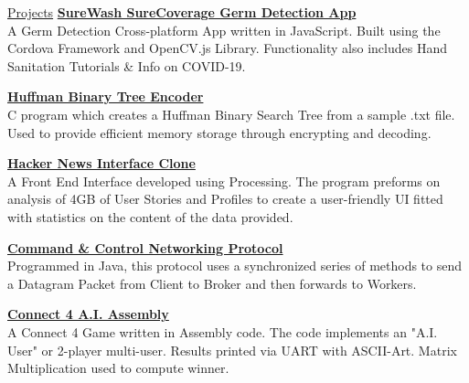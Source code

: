 \documentclass{resume} %
\begin{document}
\begin{rSection}{\href{https://github.com/Keaneyjo/}{Projects}} %
\href{https://github.com/Keaneyjo/SureCoverage}{{\bf SureWash SureCoverage Germ Detection App}}\\
A Germ Detection Cross-platform App written in JavaScript. Built using the Cordova Framework and OpenCV.js Library. Functionality also includes Hand Sanitation Tutorials \& Info on COVID-19.


\href{https://github.com/Keaneyjo/C-Huffman-Tree-Encoder}{{\bf Huffman Binary Tree Encoder}}\\
C program which creates a Huffman Binary Search Tree from a sample .txt file. Used to provide efficient memory storage through encrypting and decoding.

\href{https://github.com/Keaneyjo/Hacker-News-Interface}{{\bf Hacker News Interface Clone}}\\
A Front End Interface developed using Processing. The program preforms on analysis of 4GB of User Stories and Profiles to create a user-friendly UI fitted with statistics on the content of the data provided.

\href{https://github.com/Keaneyjo/Command-Control-Networking-Protocol}{{\bf Command \& Control Networking Protocol}}\\
Programmed in Java, this protocol uses a synchronized series of methods to send a Datagram Packet from Client to Broker and then forwards to Workers.

\href{https://github.com/Keaneyjo/Connect-4-Arm-Assembly}{{\bf Connect 4 A.I. Assembly}}\\
A Connect 4 Game written in Assembly code. The code implements an "A.I. User" or 2-player multi-user. Results printed via UART with ASCII-Art. Matrix Multiplication used to compute winner.


\end{rSection}
\end{document}
